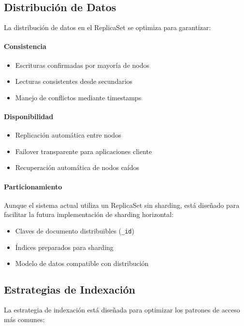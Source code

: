 \documentclass[12pt,letterpaper]{article}
\begin{document}
\subsection{Distribución de Datos}
La distribución de datos en el ReplicaSet se optimiza para garantizar:

\paragraph{Consistencia}
\begin{itemize}
    \item Escrituras confirmadas por mayoría de nodos
    \item Lecturas consistentes desde secundarios
    \item Manejo de conflictos mediante timestamps
\end{itemize}

\paragraph{Disponibilidad}
\begin{itemize}
    \item Replicación automática entre nodos
    \item Failover transparente para aplicaciones cliente
    \item Recuperación automática de nodos caídos
\end{itemize}

\paragraph{Particionamiento}
Aunque el sistema actual utiliza un ReplicaSet sin sharding, está diseñado para facilitar la futura implementación de sharding horizontal:

\begin{itemize}
    \item Claves de documento distribuibles (\texttt{\_id})
    \item Índices preparados para sharding
    \item Modelo de datos compatible con distribución
\end{itemize}

\subsection{Estrategias de Indexación}
La estrategia de indexación está diseñada para optimizar los patrones de acceso más comunes:
\end{document}
